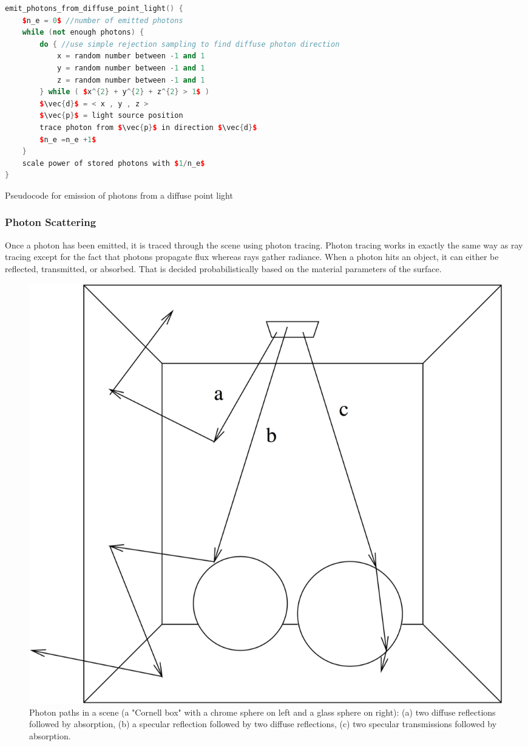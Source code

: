 \begin{algorithm}\label{lst:diffuse-point-light}
\begin{lstlisting}[language=C++, mathescape]
emit_photons_from_diffuse_point_light() {
	$n_e = 0$ //number of emitted photons 
 	while (not enough photons) {
		do { //use simple rejection sampling to find diffuse photon direction 
 			x = random number between -1 and 1
			y = random number between -1 and 1
			z = random number between -1 and 1
		} while ( $x^{2} + y^{2} + z^{2} > 1$ )
		$\vec{d}$ = < x , y , z >
		$\vec{p}$ = light source position
		trace photon from $\vec{p}$ in direction $\vec{d}$ 
 		$n_e =n_e +1$
	}
	scale power of stored photons with $1/n_e$ 
}
\end{lstlisting}
\caption{Pseudocode for emission of photons from a diffuse point light}
\end{algorithm}



\subsubsection{Photon Scattering}
Once a photon has been emitted, it is traced through the scene using photon tracing. Photon tracing works in exactly the same way as ray tracing except for the fact that photons propagate flux whereas rays gather radiance. When a photon hits an object, it can either be reflected, transmitted, or absorbed. That is decided probabilistically based on the material parameters of the surface.

\begin{figure}
\sidecaption
	\includegraphics[width=.65\textwidth]{graphics/pm/pm-4}
	\caption{Photon paths in a scene (a "Cornell box" with a chrome sphere on left and a glass sphere on right): (a) two diffuse reflections followed by absorption, (b) a specular reflection followed by two diffuse reflections, (c) two specular transmissions followed by absorption.}
\end{figure}

